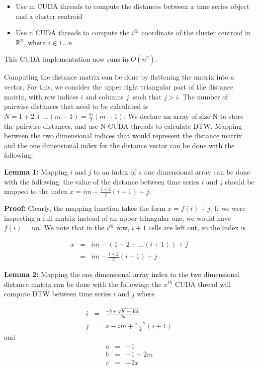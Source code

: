 \documentclass{article}
\begin{document}
\begin{itemize}
  \item Use m CUDA threads to compute the distances between a time series
    object and a cluster centroid
  \item Use n CUDA threads to compute the $i^{th}$ coordinate of the
    cluster centroid in $\mathbb{R}^n$, where $i \in {1 \ldots n}$
\end{itemize}

This CUDA implementation now runs in $O(n^2)$.

Computing the distance matrix can be done by flattening the matrix into a vector.  
For this, we consider the upper right triangular part of the distance matrix, 
with row indices $i$ and columns $j$, such that $j > i$.  The number of pairwise 
distances that need to be calculated is $N = 1 + 2 + \ldots (m-1) = \frac{m}{2} (m-1)$.  
We declare an array of size N to store the pairwise distances, and use N CUDA 
threads to calculate DTW.  Mapping between the two dimensional indices that would
represent the distance matrix and the one dimensional index for the distance
vector can be done with the following:

\textbf{Lemma 1:}  Mapping $i$ and $j$ to an index of a one dimensional array
can be done with the following: the value of the distance between time series $i$ and $j$
should be mapped to the index $x = im - \frac{i+2}{2} (i+1) + j$.

\textbf{Proof:}  Clearly, the mapping function takes the form $x = f(i) + j$.
If we were inspecting a full matrix instead of an upper triangular one, we would have
$f(i) = im$.  We note that in the $i^{th}$ row, $i+1$ cells are left out, so the index is

\begin{eqnarray}
x &=& im - (1 + 2 + \ldots (i+1)) + j\\
  &=& im - \frac{i+2}{2} (i+1) + j
\end{eqnarray}

\textbf{Lemma 2:} Mapping the one dimensional array index to the two dimensional 
distance matrix can be done with the following: the $x^{th}$ CUDA thread 
will compute DTW between time series $i$ and $j$ where 

\begin{eqnarray}
i &=& \frac{-b + \sqrt{b^2 - 4ac}}{2a}\\
j &=& x - im + \frac{i+2}{2}(i+1)
\end{eqnarray}
and
\begin{eqnarray*}
a &=& -1\\
b &=& -1 + 2m\\
c &=& -2x
\end{eqnarray*}
\end{document}
